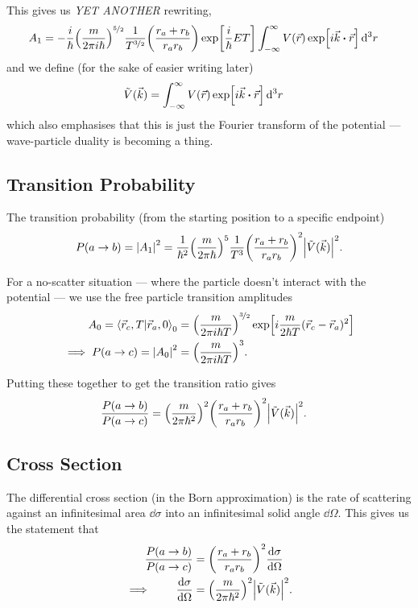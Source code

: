 \documentclass[]{revision-notes}
\begin{document}
This gives us \emph{YET ANOTHER} rewriting,
\begin{align*}
  A_1 &= -\frac{i}{\hbar}\qty(\frac{m}{2\pi i\hbar{}})^{\nicefrac{5}{2}} \frac{1}{T^{\nicefrac{3}{2}}} \qty(\frac{r_a + r_b}{r_a r_b}) \exp[\frac{i}{\hbar}ET] \int^\infty_{-\infty}  V(\vec{r}) \exp[i\vec{k}\vdot{\vec{r}}] \dd[3]{r}
\end{align*}
and we define (for the sake of easier writing later)
\begin{align*}
  \tilde{V}(\vec{k}) &= \int^\infty_{-\infty}  V(\vec{r}) \exp[i\vec{k}\vdot{\vec{r}}] \dd[3]{r}
\end{align*}
which also emphasises that this is just the Fourier transform of the potential --- wave-particle duality is becoming a thing.

\subsection{Transition Probability}
The transition probability (from the starting position to a specific endpoint)
\begin{equation*}
  P(a \to b) = \abs{A_1}^2 = \frac{1}{\hbar^2} \qty(\frac{m}{2\pi\hbar})^5 \frac{1}{T^3} \qty(\frac{r_a + r_b}{r_a r_b})^2 \abs{\tilde{V}(\vec{k})}^2.
\end{equation*}

For a no-scatter situation --- where the particle doesn't interact with the potential --- we use the free particle transition amplitudes
\begin{align*}
  A_0 = \braket{\vec{r}_c, T}{\vec{r}_a, 0}_0 &= \qty(\frac{m}{2\pi i \hbar T})^{\nicefrac{3}{2}} \exp[i\frac{m}{2\hbar T}(\vec{r}_c - \vec{r}_a)^2]\\
  \implies P(a \to c) = \abs{A_0}^2 &= \qty(\frac{m}{2\pi i \hbar T})^{3}.
\end{align*}

Putting these together to get the transition ratio gives
\begin{align*}
  \frac{P(a \to b)}{P(a \to c)} &= \qty(\frac{m}{2\pi\hbar^2})^2 \qty(\frac{r_a + r_b}{r_a r_b})^2 \abs{\tilde{V}(\vec{k})}^2.
\end{align*}

\subsection{Cross Section}
The differential cross section (in the Born approximation) is the rate of scattering against an infinitesimal area \( \dd{\sigma}\) into an infinitesimal solid angle \( \dd{\Omega} \).
This gives us the statement that
\begin{align*}
  \frac{P(a \to b)}{P(a \to c)} &= \qty(\frac{r_a + r_b}{r_a r_b})^2 \dv{\sigma}{\Omega}\\
  \implies\qquad \dv{\sigma}{\Omega} &= \qty(\frac{m}{2\pi\hbar^2})^2 \abs{\tilde{V}(\vec{k})}^2.
\end{align*}
\end{document}
